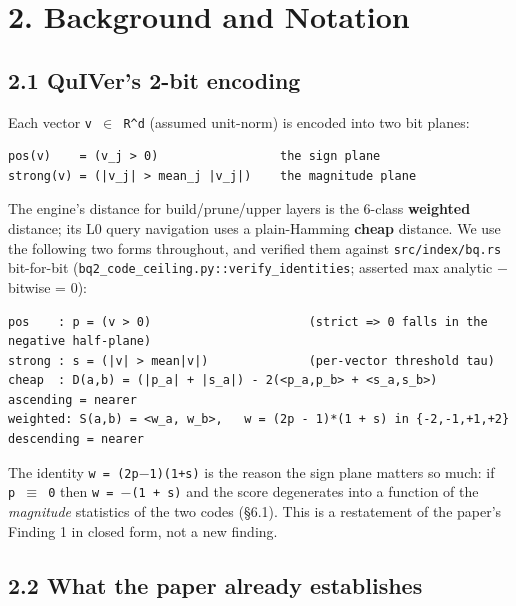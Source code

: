 \documentclass[
  10pt,
]{article}
\begin{document}
\section{2. Background and Notation}\label{background-and-notation}

\subsection{2.1 QuIVer's 2-bit encoding}\label{quivers-2-bit-encoding}

Each vector \texttt{v\ $\in$\ R\^{}d} (assumed unit-norm) is encoded into
two bit planes:

\begin{verbatim}
pos(v)    = (v_j > 0)                 the sign plane
strong(v) = (|v_j| > mean_j |v_j|)    the magnitude plane
\end{verbatim}

The engine's distance for build/prune/upper layers is the 6-class
\textbf{weighted} distance; its L0 query navigation uses a plain-Hamming
\textbf{cheap} distance. We use the following two forms throughout, and
verified them against \texttt{src/index/bq.rs} bit-for-bit
(\texttt{bq2\_code\_ceiling.py::verify\_identities}; asserted max
\textbar analytic $-$ bitwise\textbar{} = 0):

\begin{verbatim}
pos    : p = (v > 0)                      (strict => 0 falls in the negative half-plane)
strong : s = (|v| > mean|v|)              (per-vector threshold tau)
cheap  : D(a,b) = (|p_a| + |s_a|) - 2(<p_a,p_b> + <s_a,s_b>)       ascending = nearer
weighted: S(a,b) = <w_a, w_b>,   w = (2p - 1)*(1 + s) in {-2,-1,+1,+2}   descending = nearer
\end{verbatim}

The identity \texttt{w\ =\ (2p$-$1)(1+s)} is the reason the sign plane
matters so much: if \texttt{p\ $\equiv$\ 0} then \texttt{w\ =\ $-$(1\ +\ s)} and
the score degenerates into a function of the \emph{magnitude} statistics
of the two codes (§6.1). This is a restatement of the paper's Finding 1
in closed form, not a new finding.

\subsection{2.2 What the paper already
establishes}\label{what-the-paper-already-establishes}
\end{document}
